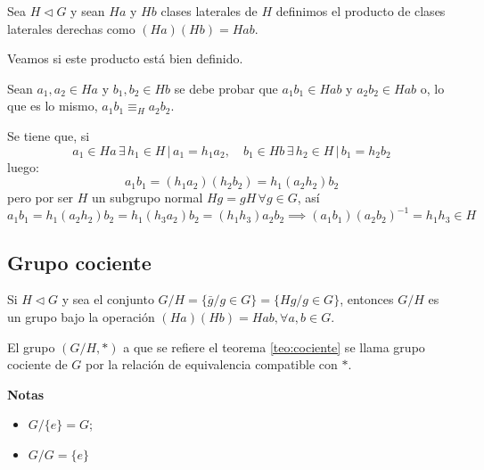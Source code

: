 	\begin{fmd-definition}
		Sea $H \triangleleft G$ y sean $Ha$ y $Hb$ clases laterales de $H$ definimos el producto de clases laterales derechas como $ (Ha) (Hb) = Hab $.
	\end{fmd-definition}
	Veamos si este producto está bien definido.
	\begin{fmd-proof}
		Sean $a_1, a_2 \in Ha$ y $b_1, b_2 \in Hb$ se debe probar que $a_1b_1 \in Hab$ y $a_2b_2 \in Hab$ o, lo que es lo mismo, $a_1b_1 \equiv_{H} a_2b_2$.
		
		Se tiene que, si
		\[ a_1 \in Ha \, \exists \, h_1 \in H \, | \, a_1 = h_1a_2, \quad b_1 \in Hb \, \exists \, h_2 \in H \, | \, b_1 = h_2b_2 \]
		luego:
		\[ a_1b_1 = (h_1a_2)(h_2b_2) = h_1 (a_2 h_2) b_2 \]
		pero por ser $H$ un subgrupo normal $Hg = gH \, \forall g \in G$, así
		\[ a_1b_1 = h_1(a_2h_2)b_2 = h_1(h_3a_2)b_2 = (h_1h_3)a_2b_2 \implies (a_1b_1)(a_2b_2)^{-1} = h_1h_3 \in H \] 
	\end{fmd-proof}

\subsection{Grupo cociente}
\vspace{1em}
\begin{fmd-theorem} \label{teo:cociente}
	Si $H \triangleleft G$ y sea el conjunto $G/H = \{ \bar{g} / g \in G \} = \{ Hg / g \in G \}$, entonces $G/H$ es un grupo bajo la operación $(Ha)(Hb) = Hab, \forall a, b \in G$.
\end{fmd-theorem}

\begin{fmd-definition}
	El grupo $(G/H, *)$ a que se refiere el teorema \ref{teo:cociente} se llama grupo cociente de $G$ por la relación de equivalencia compatible con $*$.
\end{fmd-definition}

\textbf{Notas}
\begin{itemize}
	\item $G/\{e\} = G$;
	\item $G / G = \{ e \}$
\end{itemize}

